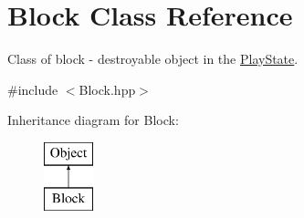 \hypertarget{class_block}{}\section{Block Class Reference}
\label{class_block}


Class of block -\/ destroyable object in the \mbox{\hyperlink{class_play_state}{Play\+State}}.  




{\ttfamily \#include $<$Block.\+hpp$>$}

Inheritance diagram for Block\+:\begin{figure}[H]
\begin{center}
\leavevmode
\includegraphics[height=2.000000cm]{class_block}
\end{center}
\end{figure}
